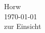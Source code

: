 \begin{titlepage}
\begin{center}

\vfill{}
\vfill{}
\vfill{}

{\large Horw\\ \today\\ zur Einsicht}

\end{center}

\end{titlepage}
